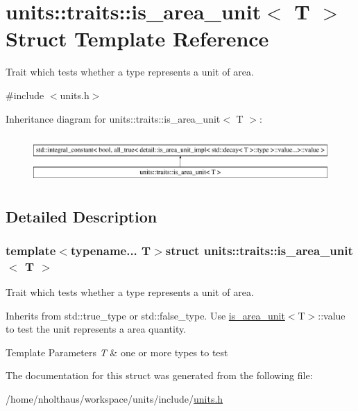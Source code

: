 \hypertarget{structunits_1_1traits_1_1is__area__unit}{}\section{units\+:\+:traits\+:\+:is\+\_\+area\+\_\+unit$<$ T $>$ Struct Template Reference}
\label{structunits_1_1traits_1_1is__area__unit}


Trait which tests whether a type represents a unit of area.  




{\ttfamily \#include $<$units.\+h$>$}

Inheritance diagram for units\+:\+:traits\+:\+:is\+\_\+area\+\_\+unit$<$ T $>$\+:\begin{figure}[H]
\begin{center}
\leavevmode
\includegraphics[height=1.812298cm]{structunits_1_1traits_1_1is__area__unit}
\end{center}
\end{figure}


\subsection{Detailed Description}
\subsubsection*{template$<$typename... T$>$struct units\+::traits\+::is\+\_\+area\+\_\+unit$<$ T $>$}

Trait which tests whether a type represents a unit of area. 

Inherits from {\ttfamily std\+::true\+\_\+type} or {\ttfamily std\+::false\+\_\+type}. Use {\ttfamily \hyperlink{structunits_1_1traits_1_1is__area__unit}{is\+\_\+area\+\_\+unit}$<$T$>$\+::value} to test the unit represents a area quantity. 
\begin{DoxyTemplParams}{Template Parameters}
{\em T} & one or more types to test \\
\hline
\end{DoxyTemplParams}


The documentation for this struct was generated from the following file\+:\begin{DoxyCompactItemize}
\item 
/home/nholthaus/workspace/units/include/\hyperlink{units_8h}{units.\+h}\end{DoxyCompactItemize}
